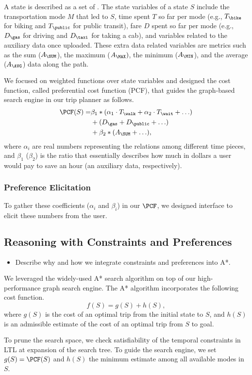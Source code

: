 A state is described as a set of .
The state variables of a state $S$ include the transportation mode $M$ that led to $S$,
time spent $T$ so far per mode (e.g., $T_\bike$ for biking and $T_\public$ for
public transit), fare $D$ spent so far per mode (e.g., $D_\gas$ for driving and
$D_\taxi$ for taking a cab), and variables related to the auxiliary data once uploaded.
These extra data related variables are metrics such as the sum ($A_\SUM$),
the maximum ($A_\MAX)$, the minimum ($A_\MIN$), and the average ($A_\AVG$) data along the path.

We focused on weighted functions over state variables and
designed the cost function, called preferential cost function (PCF), that guides the
graph-based search engine in our trip planner as follows.
\begin{equation}
	\begin{aligned}
		\PCF(S) =& \beta_1 * (\alpha_1 \cdot T_\walk + \alpha_2 \cdot T_\wait + \ldots) \\
								&+ (D_\gas + D_\public + \ldots) \\
								&+ \beta_2 * (A_\SUM + \ldots),
	\end{aligned}
\end{equation}
where $\alpha_i$ are real numbers representing the relations among different time pieces,
and $\beta_1$ ($\beta_2$) is the ratio that essentially describes how much in dollars a user would pay to
save an hour (an auxiliary data, respectively).

\subsubsection{Preference Elicitation}
To gather these coefficients ($\alpha_i$ and $\beta_i$) in our $\PCF$, we designed interface to
elicit these numbers from the user.

\subsection{Reasoning with Constraints and Preferences}
\begin{itemize}
	\setlength\itemsep{1pt}
	\item Describe why and how we integrate constraints and preferences into A*.
\end{itemize}

We leveraged the widely-used A* search algorithm on top of our high-performance graph search
engine.  The A* algorithm incorporates the following cost function.
\begin{equation}
	f(S) = g(S) + h(S),
\end{equation}
where $g(S)$ is the cost of an optimal trip from the initial state to $S$, and
$h(S)$ is an admissible estimate of the cost of an optimal trip from $S$ to goal.

To prune the search space, we check satisfiability of the temporal constraints in LTL
at expansion of the search tree.
To guide the search engine, we set $g(S)=\PCF(S)$ and $h(S)$ the minimum estimate among
all available modes in $S$.

